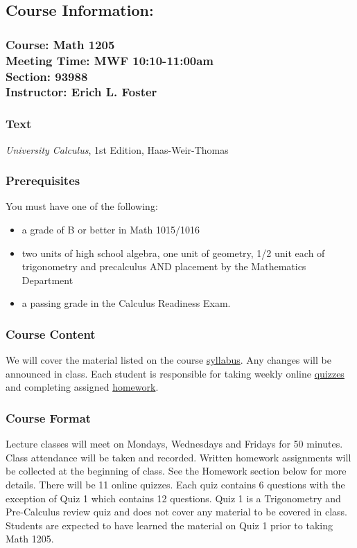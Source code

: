 \documentclass{article}
\begin{document}
	\subsection*{Course Information:}
	\subsubsection*{Course: Math 1205\\ Meeting Time: MWF 10:10-11:00am\\ Section: 93988\\ Instructor: Erich L. Foster} 
   
	\subsubsection*{Text} 
	\emph{University Calculus}, 1st Edition, Haas-Weir-Thomas
	
	\subsubsection*{Prerequisites} 
		You must have one of the following: 
		\begin{itemize}
			\item  a grade of B or better in Math 1015/1016
			\item  two units of high school algebra, one unit of geometry,
				1/2 unit each of trigonometry and precalculus AND placement by
				the Mathematics Department
			\item  a passing grade in the Calculus Readiness Exam. 
		\end{itemize} 
          
		\subsubsection*{Course Content} 
			We will cover the material listed on the course
			\href{http://www.emporium.vt.edu/math1205/resources/syllabus.html}{syllabus}.
			Any changes will be announced in class. Each student is responsible for
			taking weekly online
			\href{http://www.emporium.vt.edu/math1205/resources/quizzes}{quizzes} and
			completing assigned
			\href{http://www.emporium.vt.edu/math1205/resources/homework}{homework}.

		\subsubsection*{Course Format} 
          Lecture classes will meet on Mondays, Wednesdays and Fridays for
					50 minutes.  Class attendance will be taken and recorded. Written
					homework assignments will be collected at the beginning of class. See
					the Homework section below for more details. There will be 11 online
					quizzes. Each quiz contains 6 questions with the exception of Quiz 1
					which contains 12 questions.  Quiz 1 is a Trigonometry and
					Pre-Calculus review quiz and does not cover any material to be covered
					in class.  Students are expected to have learned the material on Quiz
					1 prior to taking Math 1205.
			
\end{document}
